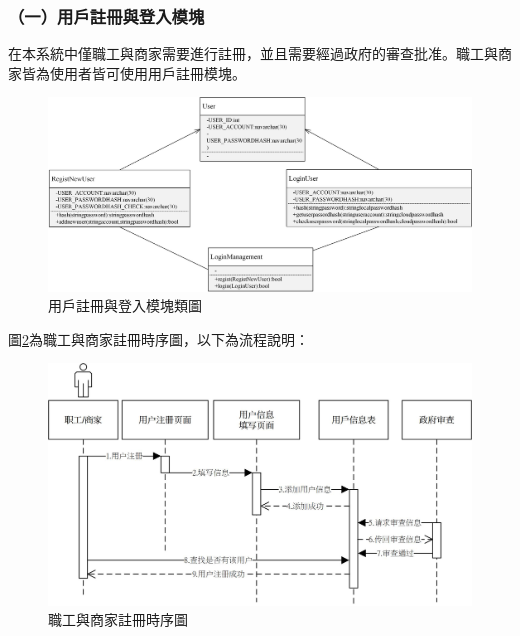 \subsubsection{（一）用戶註冊與登入模塊}
在本系統中僅職工與商家需要進行註冊，並且需要經過政府的審查批准。職工與商家皆為使用者皆可使用用戶註冊模塊。

	\begin{figure}[htbp]
		\centering
		\includegraphics[width = 1\textwidth]{c3.jpg}
		\caption{用戶註冊與登入模塊類圖}\label{c3}
	\end{figure}

	圖\ref{time1}為職工與商家註冊時序圖，以下為流程說明：

	\begin{figure}[htbp]
		\centering
		\includegraphics[width = 1\textwidth]{time1.jpg}
		\caption{職工與商家註冊時序圖}\label{time1}
	\end{figure}

